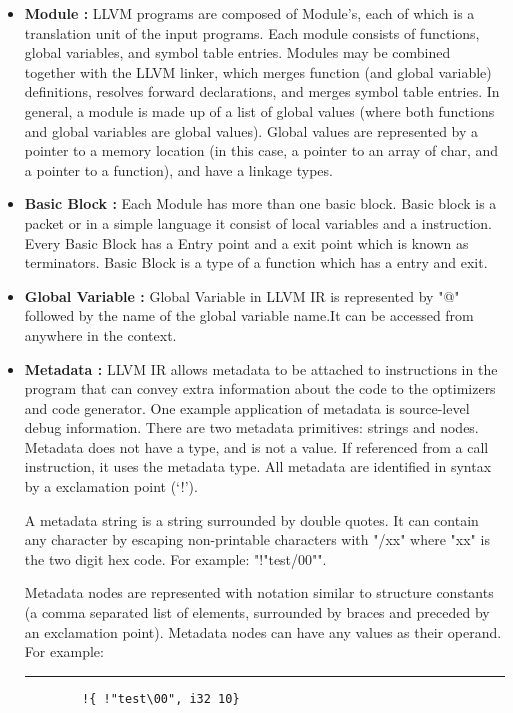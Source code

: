 \documentclass[openany]{book}
\begin{document}
\begin{itemize}
	\item \textbf{Module : } LLVM programs are composed of Module's, each of which is a translation unit of the input programs. Each module consists of functions, global variables, and symbol table entries. Modules may be combined together with the LLVM linker, which merges function (and global variable) definitions, resolves forward declarations, and merges symbol table entries. In general, a module is made up of a list of global values (where both functions and global variables are global values). Global values are represented by a pointer to a memory location (in this case, a pointer to an array of char, and a pointer to a function), and have a linkage types.
	\item \textbf{Basic Block : } Each Module has more than one basic block. Basic block is a packet or in a simple language it consist of local variables and a instruction. Every Basic Block has a Entry point and a exit point which is known as terminators. Basic Block is a type of a function which has a entry and exit.
	\item \textbf{Global Variable : } Global Variable in LLVM IR is represented by "@" followed by the name of the global variable name.It can be accessed from anywhere in the context. 
	\item \textbf{Metadata : }LLVM IR allows metadata to be attached to instructions in the program that can convey extra information about the code to the optimizers and code generator. One example application of metadata is source-level debug information. There are two metadata primitives: strings and nodes.	Metadata does not have a type, and is not a value. If referenced from a call instruction, it uses the metadata type.	All metadata are identified in syntax by a exclamation point (`!').
	
	A metadata string is a string surrounded by double quotes. It can contain any character by escaping non-printable characters with "/xx" where "xx" is the two digit hex code. For example: "!"test/00"".
	
	Metadata nodes are represented with notation similar to structure constants (a comma separated list of elements, surrounded by braces and preceded by an exclamation point). Metadata nodes can have any values as their operand. For example:\newline
	
	\noindent\rule{12cm}{0.4pt}
	
	\begin{verbatim}
		!{ !"test\00", i32 10}
	\end{verbatim}
	

\end{itemize}
\end{document}
